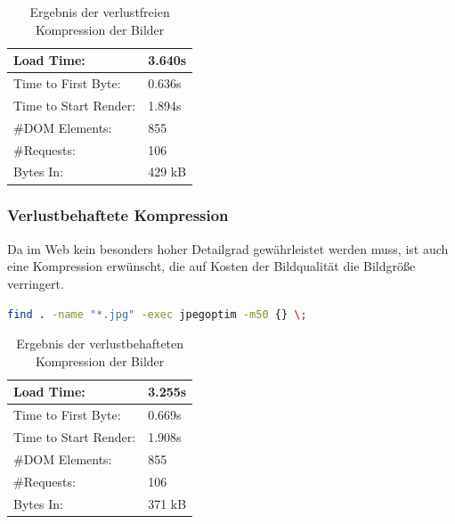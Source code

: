 \begin{table}[!ht]
\centering
\caption{Ergebnis der verlustfreien Kompression der Bilder}
    \begin{tabular}{ | p{3cm} | p{1.5cm} | }
    \hline
    Load Time: 			& 3.640s 	\\ \hline
    Time to First Byte:		& 0.636s  	\\ \hline
    Time to Start Render:	& 1.894s	\\ \hline
    \#DOM Elements:		& 855 		\\ \hline
    \#Requests:			& 106 		\\ \hline
    Bytes In:			& 429 kB 	\\ \hline
    \hline
    \end{tabular}
\end{table}

\subsubsection{Verlustbehaftete Kompression}
Da im Web kein besonders hoher Detailgrad gewährleistet werden muss, ist auch eine Kompression erwünscht, die auf Kosten der Bildqualität die Bildgröße verringert. 

\begin{minipage}[t]{1\textwidth}
\begin{lstlisting}[language=bash,label=verlustbehaftets Optimieren mit find,caption= verlustbehaftetes Optimieren mit find]
find . -name "*.jpg" -exec jpegoptim -m50 {} \;
\end{lstlisting}
\end{minipage}

\begin{table}[!ht]
\centering
\caption{Ergebnis der verlustbehafteten Kompression der Bilder}
    \begin{tabular}{ | p{3cm} | p{1.5cm} | }
    \hline
    Load Time: 			& 3.255s 	\\ \hline
    Time to First Byte:		& 0.669s  	\\ \hline
    Time to Start Render:	& 1.908s	\\ \hline
    \#DOM Elements:		& 855 		\\ \hline
    \#Requests:			& 106 		\\ \hline
    Bytes In:			& 371 kB 	\\ \hline
    \hline
    \end{tabular}
\end{table}

